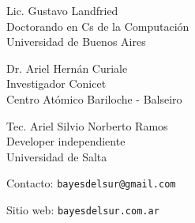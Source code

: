 \documentclass[a4paper,11pt]{article}
\begin{document}
\begin{paracol}{3}

  \scriptsize


\noindent  Lic. Gustavo Landfried \\
Doctorando en Cs de la Computación \\
Universidad de Buenos Aires



 \switchcolumn

\noindent  Dr. Ariel Hernán Curiale \\
Investigador Conicet \\
Centro Atómico Bariloche - Balseiro

 \switchcolumn

\noindent Tec. Ariel Silvio Norberto Ramos\\
Developer independiente \\
Universidad de Salta

 \end{paracol}

 \vspace{0.8cm}
\small
 Contacto: \texttt{bayesdelsur@gmail.com}

 Sitio web: \texttt{bayesdelsur.com.ar}
\end{document}
